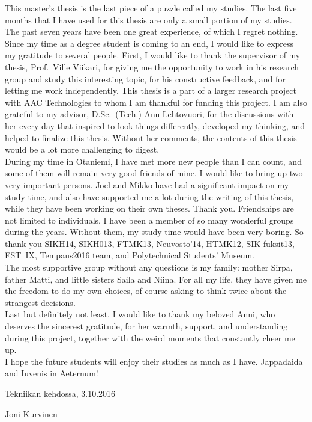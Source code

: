 {\parindent0pt
This master's thesis is the last piece of a puzzle called my studies. The last five months that I have used for this thesis are only a small portion of my studies. The past seven years have been one great experience, of which I regret nothing.\\

Since my time as a degree student is coming to an end, I would like to express my gratitude to several people. First, I would like to thank the supervisor of my thesis, Prof.\ Ville Viikari, for giving me the opportunity to work in his research group and study this interesting topic, for his constructive feedback, and for letting me work independently. This thesis is a part of a larger research project with AAC Technologies to whom I am thankful for funding this project. I am also grateful to my advisor, D.Sc.\ (Tech.) Anu Lehtovuori, for the discussions with her every day that inspired to look things differently, developed my thinking, and helped to finalize this thesis. Without her comments, the contents of this thesis would be a lot more challenging to digest.\\

During my time in Otaniemi, I have met more new people than I can count, and some of them will remain very good friends of mine. I would like to bring up two very important persons. Joel and Mikko have had a significant impact on my study time, and also have supported me a lot during the writing of this thesis, while they have been working on their own theses. Thank you. Friendships are not limited to individuals. I have been a member of so many wonderful groups during the years. Without them, my study time would have been very boring. So thank you SIKH14, SIKH013, FTMK13, Neuvosto'14, HTMK12, SIK-fuksit13, EST~IX, Tempaus2016 team, and Polytechnical Students' Museum.\\

The most supportive group without any questions is my family: mother Sirpa, father Matti, and little sisters Saila and Niina. For all my life, they have given me the freedom to do my own choices, of course asking to think twice about the strangest decisions. \\

Last but definitely not least, I would like to thank my beloved Anni, who deserves the sincerest gratitude, for her warmth, support, and understanding during this project, together with the weird moments that constantly cheer me up. \\

I hope the future students will enjoy their studies as much as I have. Jappadaida and Iuvenis in Aeternum!}

\vspace{2cm}
Tekniikan kehdossa, 3.10.2016

\vspace{5mm}
{\hfill Joni Kurvinen \hspace{1cm}}